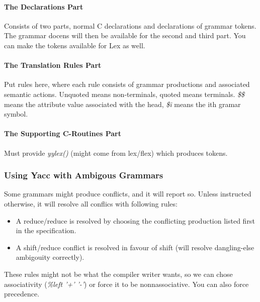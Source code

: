 \documentclass{article}
\begin{document}
\paragraph{The Declarations Part} %
\label{par:The Declarations Part}
Consists of two parts, normal C declarations and declarations of grammar tokens. The grammar docens will then be available for the second and third part. You can make the tokens available for Lex as well.

\paragraph{The Translation Rules Part} %
\label{par:The Translation Rules Part}
Put rules here, where each rule consists of grammar productions and associated semantic actions. Unquoted means non-terminals, quoted means terminals. \emph{\$\$} means the attribute value associated with the head, \emph{\$i} means the ith gramar symbol.
\paragraph{The Supporting C-Routines Part} %
\label{par:The Supporting C-Routines Part}
Must provide \emph{yylex()} (might come from lex/flex) which produces tokens.

\subsubsection{Using Yacc with Ambigous Grammars} %
\label{ssub:Using Yacc with Ambigous Grammars}
Some grammars might produce conflicts, and it will report so. Unless instructed otherwise, it will resolve all conflics with following rules:
\begin{itemize}
	\item A reduce/reduce is resolved by choosing the conflicting production listed first in the specification.
	\item A shift/reduce conflict is resolved in favour of shift (will resolve dangling-else ambigouity correctly).
\end{itemize}
These rules might not be what the compiler writer wants, so we can chose associativity (\emph{\%left '+' '-'}) or force it to be nonnassociative. You can also force precedence.
\end{document}
